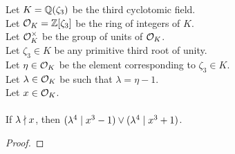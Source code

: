 \begin{lemma}
    \label{lmm:lambda_pow_four_dvd_cube_sub_one_or_add_one_of_lambda_not_dvd}
    \leanok
    Let $K = \mathbb{Q}(\zeta_3)$ be the third cyclotomic field. \\
    Let $\mathcal{O}_K = \mathbb{Z}[\zeta_3]$ be the ring of integers of $K$. \\
    Let $\mathcal{O}^\times_K$ be the group of units of $\mathcal{O}_K$. \\
    Let $\zeta_3 \in K$ be any primitive third root of unity. \\
    Let $\eta \in \mathcal{O}_K$ be the element corresponding to $\zeta_3 \in K$. \\
    Let $\lambda \in \mathcal{O}_K$ be such that $\lambda = \eta -1$. \\
    Let $x \in \mathcal{O}_K$. \\\\
    If $\lambda \nmid x$, then $(\lambda^4 \mid x^3 - 1)
    \lor (\lambda^4 \mid x ^ 3 + 1)$.
\end{lemma}
\begin{proof}
    \leanok
\end{proof}